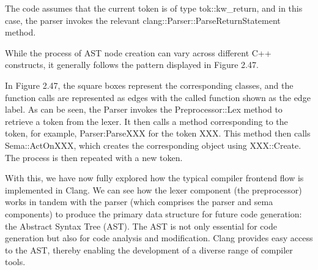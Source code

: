 The code assumes that the current token is of type tok::kw\_return, and in this case, the parser invokes the relevant clang::Parser::ParseReturnStatement method.

While the process of AST node creation can vary across different C++ constructs, it generally follows the pattern displayed in Figure 2.47.


In Figure 2.47, the square boxes represent the corresponding classes, and the function calls are represented as edges with the called function shown as the edge label. As can be seen, the Parser invokes the Preprocessor::Lex method to retrieve a token from the lexer. It then calls a method corresponding to the token, for example, Parser:ParseXXX for the token XXX. This method then calls Sema::ActOnXXX, which creates the corresponding object using XXX::Create. The process is then repeated with a new token.

With this, we have now fully explored how the typical compiler frontend flow is implemented in Clang. We can see how the lexer component (the preprocessor) works in tandem with the parser (which comprises the parser and sema components) to produce the primary data structure for future code generation: the Abstract Syntax Tree (AST). The AST is not only essential for code generation but also for code analysis and modification. Clang provides easy access to the AST, thereby enabling the development of a diverse range of compiler tools.











